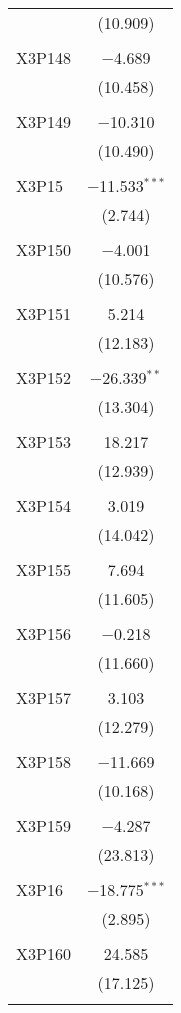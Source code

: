 \begin{table}[!htbp]
\begin{tabular}{@{\extracolsep{5pt}}lc}
  & (10.909) \\ 
  & \\ 
 X3P148 & $-$4.689 \\ 
  & (10.458) \\ 
  & \\ 
 X3P149 & $-$10.310 \\ 
  & (10.490) \\ 
  & \\ 
 X3P15 & $-$11.533$^{***}$ \\ 
  & (2.744) \\ 
  & \\ 
 X3P150 & $-$4.001 \\ 
  & (10.576) \\ 
  & \\ 
 X3P151 & 5.214 \\ 
  & (12.183) \\ 
  & \\ 
 X3P152 & $-$26.339$^{**}$ \\ 
  & (13.304) \\ 
  & \\ 
 X3P153 & 18.217 \\ 
  & (12.939) \\ 
  & \\ 
 X3P154 & 3.019 \\ 
  & (14.042) \\ 
  & \\ 
 X3P155 & 7.694 \\ 
  & (11.605) \\ 
  & \\ 
 X3P156 & $-$0.218 \\ 
  & (11.660) \\ 
  & \\ 
 X3P157 & 3.103 \\ 
  & (12.279) \\ 
  & \\ 
 X3P158 & $-$11.669 \\ 
  & (10.168) \\ 
  & \\ 
 X3P159 & $-$4.287 \\ 
  & (23.813) \\ 
  & \\ 
 X3P16 & $-$18.775$^{***}$ \\ 
  & (2.895) \\ 
  & \\ 
 X3P160 & 24.585 \\ 
  & (17.125) \\ 
  & \\ 

\end{tabular}
\end{table}
